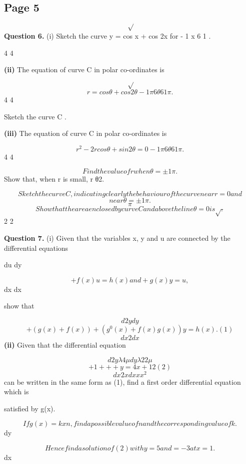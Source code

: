 \documentclass[12pt]{article}
\begin{document}
\subsection*{Page 5}
\begin{flushleft}
\[\sqrt\]
\bigskip\textbf{Question 6.} (i) Sketch the curve y = cos x + cos 2x for - 1  x 6 1 \pi.\par
4 4\par
\textbf{(ii)} The equation of curve C in polar co-ordinates is\par
\[\sqrt\]
\[r = cos θ + cos 2θ - 1 \pi 6 θ 6 1 \pi.\]
4 4\par
Sketch the curve C .\par
\textbf{(iii)} The equation of curve C in polar co-ordinates is\par
\[r^2 - 2r cos θ + sin2 θ = 0 - 1 \pi 6 θ 6 1 \pi.\]
4 4\par
\[Find the value of r when θ = ± 1 \pi.\]
Show that, when r is small, r  θ2.\par
\[Sketch the curve C , indicating clearly the behaviour of the curve near r = 0 and\]
\[near θ = ± 1 \pi.\]
\[\pi\]
\[Show that the area enclosed by curve C and above the line θ = 0 is \sqrt .\]
2 2\par
\bigskip\textbf{Question 7.} (i) Given that the variables x, y and u are connected by the differential equations\par
du dy\par
\[+ f(x)u = h(x) and + g(x)y = u,\]
dx dx\par
show that\par
\[d2y dy\]
\[+ (g(x) + f(x)) + (g^0(x) + f(x)g(x))y = h(x). (1)\]
\[dx2 dx\]
\textbf{(ii)} Given that the differential equation\par
\[d2y \lambda 4 \mu dy \lambda 2 2 \mu\]
\[+ 1 + + + y = 4x + 12 (2)\]
\[dx2 x dx x x^2\]
can be written in the same form as (1), find a first order differential equation which is\par
satisfied by g(x).\par
\[If g(x) = kxn, find a possible value of n and the corresponding value of k.\]
dy\par
\[Hence find a solution of (2) with y = 5 and = -3 at x = 1.\]
dx\par
\end{flushleft}
\end{document}
